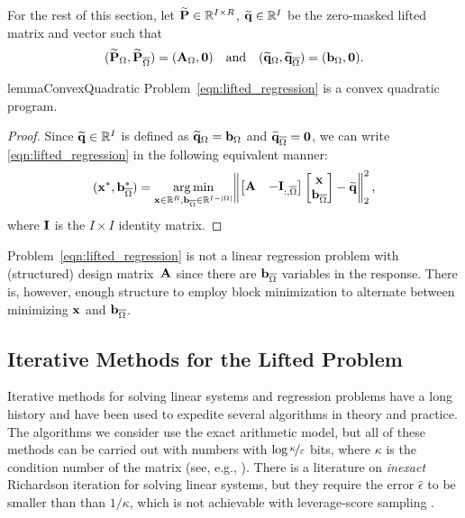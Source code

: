 For the rest of this section,
let $\widetilde{\mat{P}} \in \R^{I\times R}$, $\widetilde{\mat{q}}\in \R^{I}$
be the zero-masked lifted matrix and vector such that
\[
    (\widetilde{\mat{P}}_{\Omega}, \widetilde{\mat{P}}_{\overline{\Omega}}) = (\mat{A}_{\Omega}, \boldsymbol{0})
    \quad
    \text{and}
    \quad
    (\widetilde{\mat{q}}_{\Omega}, \widetilde{\mat{q}}_{\overline{\Omega}})
    =
    (\mat{b}_{\Omega}, \boldsymbol{0}).
\]

\begin{restatable}{lemma}{ConvexQuadratic}
\label{lem:lifted_problem_is_convex_quadratic}
Problem~\ref{eqn:lifted_regression} is a convex quadratic program.
\end{restatable}

\begin{proof}
Since $\widetilde{\mat{q}}\in \R^{I}$ is defined as $\widetilde{\mat{q}}_{\Omega} = \mat{b}_{\Omega}$ and $\widetilde{\mat{q}}_{\overline{\Omega}} = \boldsymbol{0}$,
we can write \eqref{eqn:lifted_regression} in the following equivalent manner:
\[
    (\mat{x}^*, \mat{b}^*_{\overline{\Omega}})
    =
    \argmin_{\mat{x} \in \R^R, \mat{b}_{\overline{\Omega}}\in\R^{I-|\Omega|}}
    \norm*{
    \begin{bmatrix}
        \mat{A} & -\mat{I}_{:,\overline{\Omega}}
    \end{bmatrix}
    \begin{bmatrix}
        \mat{x} \\ \mat{b}_{\overline{\Omega}}
    \end{bmatrix}
    -
    \widetilde{\mat{q}}
    }_{2}^2\,,
\]
where $\mat{I}$ is the $I\times I$ identity matrix.
\end{proof}

\begin{remark}
Problem~\ref{eqn:lifted_regression} is  not a linear regression problem
with (structured) design matrix~$\mat{A}$ since there are $\mat{b}_{\overline{\Omega}}$ variables in the response.
There is, however, enough structure to employ block minimization to alternate between minimizing $\mat{x}$ and $\mat{b}_{\overline{\Omega}}$.
\end{remark}

\subsection{Iterative Methods for the Lifted Problem}
\label{subsec:iterative_methods}

Iterative methods for solving linear systems and regression problems have a long history and have been used to expedite several algorithms in theory and practice.
The algorithms we consider use the exact arithmetic model, but all of these methods can be carried out with numbers with $\log \nicefrac{\kappa}\epsilon$ bits, where $\kappa$ is the condition number of the matrix (see, e.g., \citet{ghadiri2023bit,ghadiri2024improving}).
There is a literature on \emph{inexact} Richardson iteration for solving linear systems, 
but they require the error $\widehat{\epsilon}$ to be smaller than than $1/\kappa$,
which is not achievable with leverage-score sampling \cite{golub1988convergence,golub1997closer}.

